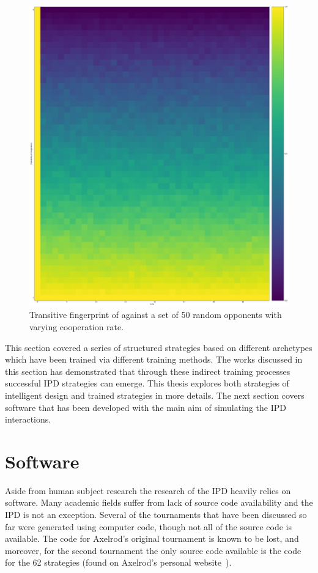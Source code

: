 \begin{figure}[!hbtp]
    \centering
    \includegraphics[height=.3\textheight]{src/chapters/02/img/Tit_for_Tat_fingerprint}
    \caption{Transitive fingerprint of \TitForTat against a set of 50 random opponents
    with varying cooperation rate.}
    \label{fig:transitive_fingerprinting}
\end{figure}

This section covered a series of structured strategies based on different
archetypes which have been trained via different training methods. The works
discussed in this section has demonstrated that through these indirect
training processes successful IPD strategies can emerge. This thesis explores
both strategies of intelligent design and
trained strategies in more details. The next section
covers software that has been developed with the main aim of simulating the IPD
interactions.

\section{Software}\label{section:software}

Aside from human subject research the research of the IPD heavily relies on software.
Many academic fields suffer from lack of source code availability and the IPD
is not an exception. Several of the tournaments that have been discussed so far were generated
using computer code, though not all of the source code is available.
The code for Axelrod's original tournament is known to be lost, and
moreover, for the second tournament the only source code available is the code
for the 62 strategies (found on Axelrod's personal website~\cite{fortan_code}).

